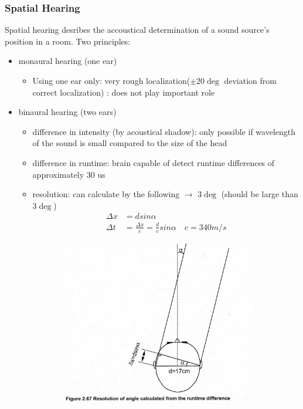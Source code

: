 \documentclass{standalone}
\begin{document}
\subsubsection{Spatial Hearing}
Spatial hearing desribes the accoustical determination of a sound source's position in a room. Two principles:
\begin{itemize}
	\item monaural hearing (one ear)
	\begin{itemize}
		\item Using one ear only: very rough localization($\pm 20 \deg$ deviation from correct localization) : does not play important role
	\end{itemize}
	\item binaural hearing (two ears)
	\begin{itemize}
		\item difference in intensity (by acoustical shadow): only possible if wavelength of the sound is small compared to the size of the head 
		\item difference in runtime: brain capable of detect runtime differences of approximately 30 us
		\item resolution: can calculate by the following $\rightarrow$ $3\deg$ (should be large than $3\deg$)
			\begin{align}
				\Delta x &= d sin \alpha \\
				\Delta t &= \frac{\Delta x}{c} = \frac{d}{c} sin \alpha \quad c = 340m/s
			\end{align}
	\end{itemize}
	\begin{figure}[H]
			\centering
		\begin{subfigure}[b]{0.45\textwidth}
			\includegraphics[width = 0.7\linewidth]{Figures/2_67.png}

\end{subfigure}
\end{figure}
\end{itemize}
\end{document}
